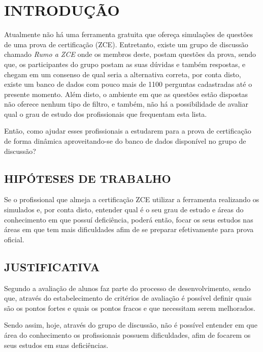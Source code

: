 \chapter{INTRODUÇÃO}
\label{chp:intro}

Atualmente não há uma ferramenta gratuita que ofereça simulações de questões de 
uma prova de certificação \textit{\ZCE} (ZCE). Entretanto, existe um 
grupo de discussão chamado \textit{Rumo a ZCE} onde os membros deste, postam
questões da prova, sendo que, os participantes do grupo postam as suas dúvidas 
e também respostas, e chegam em um consenso de qual seria a alternativa correta,
por conta disto, existe um banco de dados com pouco mais de 1100 perguntas 
cadastradas até o presente momento. Além disto, o ambiente em que as questões 
estão dispostas não oferece nenhum tipo de filtro, e também, não há a 
possibilidade de avaliar qual o grau de estudo dos profissionais que frequentam 
esta lista.

Então, como ajudar esses profissionais a estudarem para a prova de certificação 
de forma dinâmica aproveitando-se do banco de dados disponível no grupo de 
discussão?

\section{HIPÓTESES DE TRABALHO}

Se o profissional que almeja a certificação ZCE utilizar a ferramenta realizando
os simulados e, por conta disto, entender qual é o seu grau de estudo e áreas 
do conhecimento em que possuí deficiência, poderá então, focar os seus estudos 
nas áreas em que tem mais dificuldades afim de se preparar efetivamente para 
prova oficial.

\section{JUSTIFICATIVA}

Segundo  a avaliação de  alunos
faz parte do processo de desenvolvimento, sendo que, através do estabelecimento 
de critérios de avaliação é possível definir quais são os pontos fortes e  quais
os pontos fracos e que necessitam serem melhorados.

Sendo assim, hoje, através do grupo de discussão, não é possível entender em 
que área do conhecimento os profissionais possuem dificuldades, afim de focarem
os seus estudos em suas deficiências.

